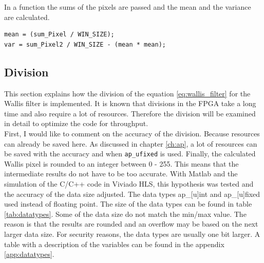 In a function the sums of the pixels are passed and the mean and the variance are calculated. \\
\begin{minipage}{\textwidth}
\begin{lstlisting}[style=CStyle, caption=Calculation of the mean and variance, label=lst:mean_var]
mean = (sum_Pixel / WIN_SIZE);
var = sum_Pixel2 / WIN_SIZE - (mean * mean);
\end{lstlisting}
\end{minipage}


\subsection{Division} \label{ch:hls:div}
This section explains how the division of the equation \ref{eq:wallis_filter} for the Wallis filter is implemented. It is known that divisions in the FPGA take a long time and also require a lot of resources. Therefore the division will be examined in detail to optimize the code for throughput. \\
First, I would like to comment on the accuracy of the division. Because
resources can already be saved here. As discussed in chapter \ref{ch:ap}, a lot
of resources can be saved with the accuracy and when \texttt{ap\_ufixed} is used.
Finally, the calculated Wallis pixel is rounded to an integer between 0 - 255.
This means that the intermediate results do not have to be too accurate. With
Matlab and the simulation of the C/C++ code in Viviado HLS, this hypothesis was
tested and the accuracy of the data size adjusted. The data types ap\_[u]int and
ap\_[u]fixed used instead of floating point. The size of the data types can be
found in table \ref{tab:datatypes}. Some of the data size do not match the
min/max value. The reason is that the results are rounded and an overflow may be
based on the next larger data size. For security reasons, the data types are
usually one bit larger. A table with a description of the variables can be found
in the appendix \ref{app:datatypes}.

